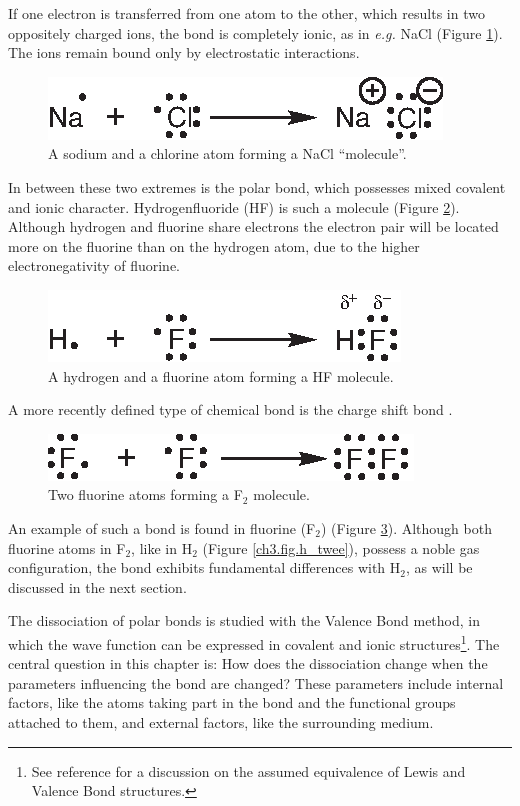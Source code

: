 If one electron is transferred from one atom to the other, which results in two oppositely charged ions, the bond is completely ionic, as in \textit{e.g.} NaCl (Figure \ref{ch3.fig.nacl}). The ions remain bound only by electrostatic interactions. 
\begin{figure}[ht]
\center
\includegraphics{dissociation/figures/nacl.eps}
\caption{A sodium and a chlorine atom forming a NaCl ``molecule''.}
\label{ch3.fig.nacl}
\end{figure}

In between these two extremes is the polar bond, which possesses mixed covalent and ionic character. Hydrogenfluoride (HF) is such a molecule (Figure \ref{ch3.fig.hf}). Although hydrogen and fluorine share electrons the electron pair will be located more on the fluorine than on the hydrogen atom, due to the higher electronegativity of fluorine.
\begin{figure}[ht]
\center
\includegraphics{dissociation/figures/hf.eps}
\caption{A hydrogen and a fluorine atom forming a HF molecule.}
\label{ch3.fig.hf}
\end{figure}

A more recently defined type of chemical bond is the charge shift bond \cite{cs1,cs2}.
\begin{figure}[h]
\center
\includegraphics{dissociation/figures/f_twee.eps}
\caption{Two fluorine atoms forming a F$_2$ molecule.}
\label{ch3.fig.f_twee} 
\end{figure}
 An example of such a bond is found in fluorine (F$_2$)  (Figure \ref{ch3.fig.f_twee}). Although both fluorine atoms in F$_2$, like in H$_2$ (Figure \ref{ch3.fig.h_twee}), possess a noble gas configuration, the bond exhibits fundamental differences with H$_2$, as will be discussed in the next section.

The dissociation of polar bonds is studied with the Valence Bond method, in which the wave function can be expressed in covalent and ionic structures\footnote{See reference \cite{interpret} for a discussion on the assumed equivalence of Lewis and Valence Bond structures.}. The central question in this chapter is: How does the dissociation change when the parameters influencing the bond are changed? These parameters include internal factors, like the atoms taking part in the bond and the functional groups attached to them, and external factors, like the surrounding medium. 


